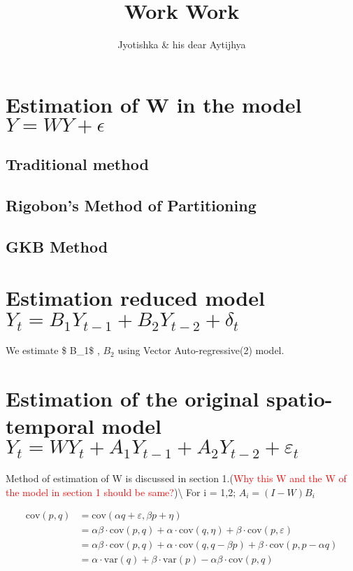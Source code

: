 \documentclass[
  12pt,
]{article}
\title{Work Work}
\author{Jyotishka \& his dear Aytijhya}
\date{}
\begin{document}
\maketitle


\section{\textbf{\textcolor{DeepBlue}{Estimation of W in the model $ Y=WY +\epsilon $}}}
\subsection{Traditional method}

\subsection{Rigobon's Method of Partitioning}

\subsection{GKB Method}

\section{\textbf{\textcolor{DeepBlue}{Estimation reduced model $  Y_t = B_1 Y_{t-1} + B_2 Y_{t-2} + \delta_t $}}}

We estimate \$ B\_1\$ , \(B_2\) using Vector Auto-regressive(2) model.

\section{\textbf{\textcolor{DeepBlue}{Estimation of the original spatio-temporal model $ Y_t = WY_t + A_1 Y_{t-1} + A_2 Y_{t-2} + \varepsilon_t $}}}

Method of estimation of W is discussed in section
1.(\textcolor{red}{Why this W and the W of the model in section 1 should be same?})\textbackslash{}
For i = 1,2; \(A_i = (I-W)B_i\)

\begin{align*}
    \text{cov}(p,q) &= \text{cov}(\alpha q + \varepsilon , \beta p + \eta)\\
    &= \alpha\beta\cdot\text{cov}(p,q) + \alpha\cdot\text{cov}(q,\eta) + \beta\cdot\text{cov}(p,\varepsilon)\\
    &= \alpha\beta\cdot\text{cov}(p,q) + \alpha\cdot\text{cov}(q,q - \beta p) + \beta\cdot\text{cov}(p,p - \alpha q)\\
    &= \alpha\cdot\text{var}(q) + \beta\cdot\text{var}(p) - \alpha\beta\cdot\text{cov}(p,q)
\end{align*}
\end{document}
